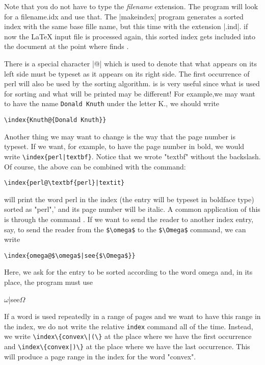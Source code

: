 \begin{multicols}{2}
Note that you do not have to type the \textit{filename} extension. The program will look for a filename.idx and use that.
The |makeindex| program generates a sorted index with the same base fille name, but this time with the extension |.ind|. if now
the LaTeX input file is processed again, this sorted index gets included into the document at the point where \latex
finds .

There is a  special character |@| which is used to denote that what appears on its left side must be
typeset as it appears on its right side.  The first occurrence of perl will also be used
by the sorting algorithm. is is very useful since what is used for sorting and what
will be printed may be different! For example,we may want to have the name 
\texttt{Donald Knuth}  under the letter K., we should write


\verb+\index{Knuth@{Donald Knuth}}+

Another thing we may want to change is the way that the page number is typeset.
If we want, for example, to have the page number in bold, we would write
\verb+\index{perl|textbf}+.  Notice that we wrote "textbf"  without the backslash. Of course,
the above can be combined with the  command:


\verb+\index{perl@\textbf{perl}|textit}+


will print the word perl in the index (the entry will be typeset in boldface type) sorted
as "perl",’ and its page number will be italic. A common application of this is through
the command . If we want to send the reader to another index entry, say, to send
the reader from the \verb+$\omega$+ to the \verb+$\Omega$+ command, we can write

\verb+\index{omega@$\omega$|see{$\Omega$}}+


Here, we ask for the entry to be sorted according to the word omega and, in its place,
the program must use 

\begin{teX}
$\omega$|see{$\Omega$}
\end{teX}

If a word is used repeatedly in a range of pages and we want to have this range
in the index, we do not write the relative \texttt{index} command all of the time. Instead,
we write \verb+\index\{convex\|(\}+  at the place where we have the first occurrence and
\verb+\index\{convex|)\}+  at the place where we have the last occurrence. This will produce a
page range in the index for the word "convex".


\end{multicols}
